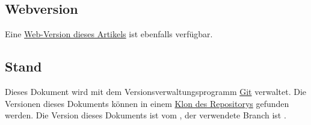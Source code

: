 \subsection{Webversion}
Eine \href{http://blog.kreuvf.de/2015/06/04/dsa-regeln-fur-viertelzauberer/}{Web-Version dieses Artikels} ist ebenfalls verfügbar.

\subsection{Stand}
Dieses Dokument wird mit dem Versionsverwaltungsprogramm \href{http://git-scm.com/}{Git} verwaltet. Die Versionen dieses Dokuments können in einem \href{https://github.com/kreuvf/dsa-regeln-viertelzauberer}{Klon des Repositorys} gefunden werden. Die Version dieses Dokuments ist \gitAbbrevHash{} vom \gitAuthorIsoDate, der verwendete Branch ist \gitBranch.